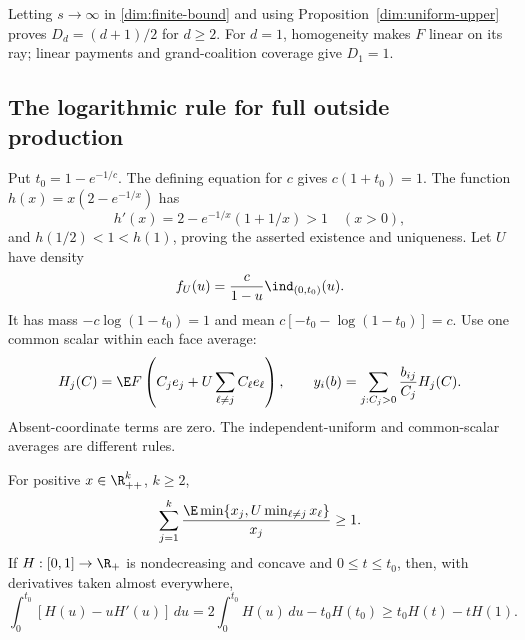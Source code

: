 Letting $s\to\infty$ in \eqref{dim:finite-bound} and using
Proposition~\ref{dim:uniform-upper} proves $D_d=(d+1)/2$ for $d\ge2$.
For $d=1$, homogeneity makes $F$ linear on its ray; linear payments and
grand-coalition coverage give $D_1=1$.

\subsection{The logarithmic rule for full outside production}

Put $t_0=1-e^{-1/c}$. The defining equation for $c$ gives
$c(1+t_0)=1$. The function $h(x)=x(2-e^{-1/x})$ has
\[
 h'(x)=2-e^{-1/x}(1+1/x)>1\quad(x>0),
\]
and $h(1/2)<1<h(1)$, proving the asserted existence and uniqueness.
Let $U$ have density
\begin{equation}\label{dim:log-law}
 f_U(u)=\frac{c}{1-u}\ind_{(0,t_0)}(u).
\end{equation}
It has mass $-c\log(1-t_0)=1$ and mean
$c[-t_0-\log(1-t_0)]=c$.
Use one common scalar within each face average:
\begin{equation}\label{dim:log-rule}
 H_j(C)=\E F\left(C_je_j+U\sum_{\ell\ne j}C_\ell e_\ell\right),
 \qquad y_i(b)=\sum_{j:C_j>0}\frac{b_{ij}}{C_j}H_j(C).
\end{equation}
Absent-coordinate terms are zero. The independent-uniform and common-scalar
averages are different rules.

\begin{lemma}\label{dim:scalar}
For positive $x\in\R_{++}^k$, $k\ge2$,
\begin{equation}\label{dim:ray-lemma}
 \sum_{j=1}^k\frac{\E\min\{x_j,U\min_{\ell\ne j}x_\ell\}}{x_j}\ge1.
\end{equation}
If $H:[0,1]\to\R_+$ is nondecreasing and concave and $0\le t\le t_0$,
then, with derivatives taken almost everywhere,
\begin{equation}\label{dim:hinge-lemma}
 \int_0^{t_0}[H(u)-uH'(u)]\,du
 =2\int_0^{t_0}H(u)\,du-t_0H(t_0)
 \ge t_0H(t)-tH(1).
\end{equation}
\end{lemma}

